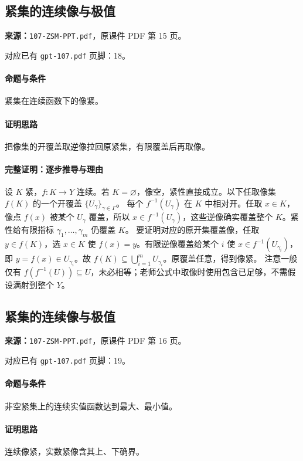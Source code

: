 \clearpage\subsection{紧集的连续像与极值}
\textbf{来源：}\texttt{107-ZSM-PPT.pdf}，原课件 PDF 第 15 页。\par
对应已有 \texttt{gpt-107.pdf} 页脚：18。\par
\paragraph{命题与条件}紧集在连续函数下的像紧。
\paragraph{证明思路}把像集的开覆盖取逆像拉回原紧集，有限覆盖后再取像。
\paragraph{完整证明：逐步推导与理由}

设 $K$ 紧，$f:K\to Y$ 连续。若 $K=\varnothing$，像空，紧性直接成立。以下任取像集 $f(K)$ 的一个开覆盖 $\{U_\gamma\}_{\gamma\in\Gamma}$。
每个 $f^{-1}(U_\gamma)$ 在 $K$ 中相对开。任取 $x\in K$，像点 $f(x)$ 被某个 $U_\gamma$ 覆盖，所以 $x\in f^{-1}(U_\gamma)$，这些逆像确实覆盖整个 $K$。紧性给有限指标 $\gamma_1,\ldots,\gamma_m$ 仍覆盖 $K$。
要证明对应的原开集覆盖像，任取 $y\in f(K)$，选 $x\in K$ 使 $f(x)=y$。有限逆像覆盖给某个 $i$ 使 $x\in f^{-1}(U_{\gamma_i})$，即 $y=f(x)\in U_{\gamma_i}$。故 $f(K)\subseteq\bigcup_{i=1}^mU_{\gamma_i}$。原覆盖任意，得到像紧。
注意一般仅有 $f(f^{-1}(U))\subseteq U$，未必相等；老师公式中取像时使用包含已足够，不需假设满射到整个 $Y$。

\clearpage\subsection{紧集的连续像与极值}
\textbf{来源：}\texttt{107-ZSM-PPT.pdf}，原课件 PDF 第 16 页。\par
对应已有 \texttt{gpt-107.pdf} 页脚：19。\par
\paragraph{命题与条件}非空紧集上的连续实值函数达到最大、最小值。
\paragraph{证明思路}连续像紧，实数紧像含其上、下确界。
